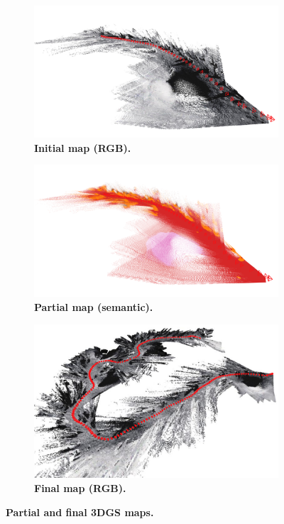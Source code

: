 \begin{figure}[b!]
	\centering
	\begin{subfigure}[b]{0.49\linewidth}
		\includegraphics[width=\linewidth]{figures/3dgs/render-partial-rgb.png}
		\caption{\bfseries Initial map (RGB).}
	\end{subfigure}
	\hfill
	\begin{subfigure}[b]{0.49\linewidth}
		\includegraphics[width=\linewidth]{figures/3dgs/render-partial-semantic.png}
		\caption{\bfseries Partial map (semantic).}
	\end{subfigure}
	\begin{subfigure}[b]{\linewidth}
		\includegraphics[width=\linewidth,trim=0 0 0 0,clip]{figures/3dgs/render-full.png}
		\caption{\bfseries Final map (RGB).}
	\end{subfigure}
	\caption{\bfseries Partial and final 3DGS maps.}
	\label{fig:map_3dgs}
\end{figure}

